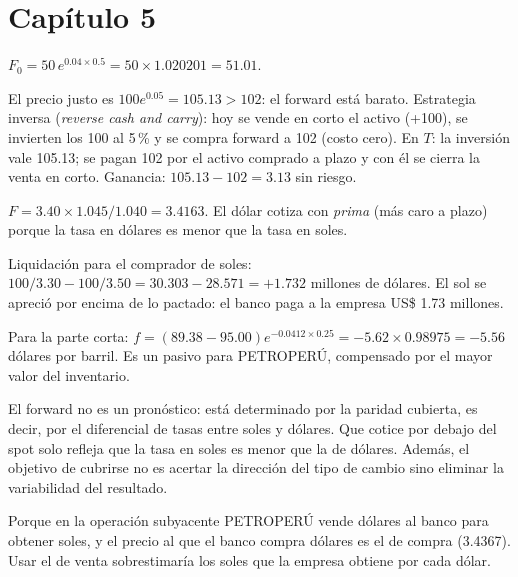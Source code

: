 \section*{Capítulo 5}

 $F_0=50\,e^{0.04\times0.5}=50\times1.020201=51.01$.

 El precio justo es $100e^{0.05}=105.13>102$: el forward está barato. Estrategia inversa (\emph{reverse cash and carry}): hoy se vende en corto el activo (+100), se invierten los 100 al 5\,\% y se compra forward a 102 (costo cero). En $T$: la inversión vale 105.13; se pagan 102 por el activo comprado a plazo y con él se cierra la venta en corto. Ganancia: $105.13-102=3.13$ sin riesgo.

 $F=3.40\times1.045/1.040=3.4163$. El dólar cotiza con \emph{prima} (más caro a plazo) porque la tasa en dólares es menor que la tasa en soles.

 Liquidación para el comprador de soles: $100/3.30-100/3.50=30.303-28.571=+1.732$ millones de dólares. El sol se apreció por encima de lo pactado: el banco paga a la empresa US\$ 1.73 millones.

 Para la parte corta: $f=(89.38-95.00)e^{-0.0412\times0.25}=-5.62\times0.98975=-5.56$ dólares por barril. Es un pasivo para PETROPERÚ, compensado por el mayor valor del inventario.

 El forward no es un pronóstico: está determinado por la paridad cubierta, es decir, por el diferencial de tasas entre soles y dólares. Que cotice por debajo del spot solo refleja que la tasa en soles es menor que la de dólares. Además, el objetivo de cubrirse no es acertar la dirección del tipo de cambio sino eliminar la variabilidad del resultado.

 Porque en la operación subyacente PETROPERÚ vende dólares al banco para obtener soles, y el precio al que el banco compra dólares es el de compra (3.4367). Usar el de venta sobrestimaría los soles que la empresa obtiene por cada dólar.
